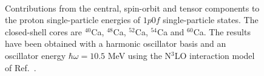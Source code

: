 \documentclass[aps,showpacs,floatfix,nofootinbib,preprintnumbers,superscriptaddress,amsmath,amssymb]{revtex4-1}
\begin{document}
\begin{figure}%
     \begin{center}
        \\ %
    \end{center}
\caption{Contributions from the central, spin-orbit and tensor components to  
the proton single-particle energies of $1p0f$ single-particle states. 
The closed-shell cores are $^{40}$Ca, $^{48}$Ca, $^{52}$Ca, 
$^{54}$Ca and $^{60}$Ca. The results have been obtained with a harmonic oscillator basis and an 
oscillator energy $\hbar\omega =10.5$ MeV using the N$^3$LO interaction model of Ref.~\cite{machleidt2011}.}
\label{fig:hoprotonCa}
\end{figure}
\end{document}
